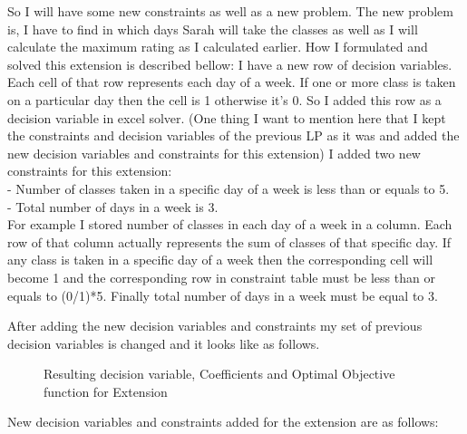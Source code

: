 \documentclass[paper=letter, fontsize=11pt]{scrartcl} %
\begin{document}
So I will have some new constraints as well as a new problem. The new problem is, I have to find in which days Sarah will take the classes as well as I will calculate the maximum rating as I calculated earlier. How I formulated and solved this extension is described bellow:\newline
I have a new row of decision variables. Each cell of that row represents each day of a week. If one or more class is taken on a particular day then the cell is 1 otherwise it's 0. So I added this row as a decision variable in excel solver. (One thing I want to mention here that I kept the constraints and decision variables of the previous LP as it was and added the new decision variables and constraints for this extension)
I added two new constraints for this extension:\\
- Number of classes taken in a specific day of a week is less than or equals to 5.\\
- Total number of days in a week is 3.\\

For example I stored number of classes in each day of a week in a column. Each row of that column actually represents the sum of classes of that specific day. If any class is taken in a specific day of a week then the corresponding cell will become 1 and the corresponding row in constraint table must be less than or equals to (0/1)*5.  Finally total number of days in a week must be equal to 3. 

After adding the new decision variables and constraints my set of previous decision variables is changed and it looks like as follows.
\begin{figure}[H]
  
  \centering
    \caption{Resulting decision variable, Coefficients and Optimal Objective function for Extension}
\end{figure}
\newline
New decision variables and constraints added for the extension are as follows:
\end{document}
